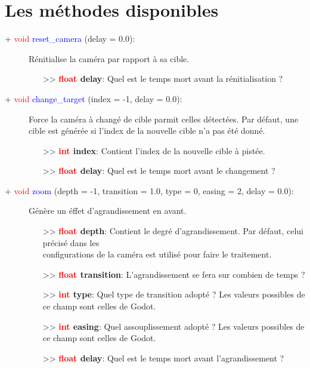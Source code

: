 \documentclass[a4paper, 11pt]{article}
\begin{document}
	\section{Les méthodes disponibles}
	\begin{description}
		\item [+ \textcolor{red}{void} \textcolor{blue}{reset\_camera} (delay = 0.0):] Rénitialise la caméra
		par rapport à sa cible.
		\begin{itemize}
			\item [>> \textbf{\textcolor{red}{float} delay}:] Quel est le temps mort avant la 
			rénitialisation ?\\
		\end{itemize}
	\end{description}
	\begin{description}
		\item [+ \textcolor{red}{void} \textcolor{blue}{change\_target} (index = -1, delay = 0.0):] Force la 
		caméra à changé de cible parmit celles détectées. Par défaut, une cible est générée si l'index de la 
		nouvelle cible n'a pas été donné.
		\begin{itemize}
			\item [>> \textbf{\textcolor{red}{int} index}:] Contient l'index de la nouvelle cible à pistée.
			\item [>> \textbf{\textcolor{red}{float} delay}:] Quel est le temps mort avant le changement ?\\
		\end{itemize}
	\end{description}
	\begin{description}
		\item [+ \textcolor{red}{void} \textcolor{blue}{zoom} (depth = -1, transition = 1.0, type = 0, 
		easing = 2, delay = 0.0):] Génère un éffet d'agrandissement en avant.
		\begin{itemize}
			\item [>> \textbf{\textcolor{red}{float} depth}:] Contient le degré d'agrandissement. Par 
			défaut, celui précisé dans les \\configurations de la caméra est utilisé pour faire le 
			traitement.
			\item[>> \textbf{\textcolor{red}{float} transition}:] L'agrandissement se fera sur combien de 
			temps ?
			\item[>> \textbf{\textcolor{red}{int} type}:] Quel type de transition adopté ? Les valeurs 
			possibles de ce champ sont celles de Godot.
			\item[>> \textbf{\textcolor{red}{int} easing}:] Quel assouplissement adopté ? Les valeurs 
			possibles de ce champ sont celles de Godot.
			\item [>> \textbf{\textcolor{red}{float} delay}:] Quel est le temps mort avant l'agrandissement 
			?\\
		\end{itemize}
	\end{description}
\end{document}
